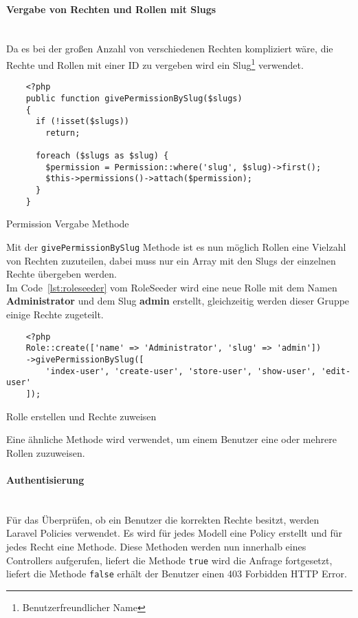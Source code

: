 \paragraph{Vergabe von Rechten und Rollen mit Slugs}\mbox{}\\
Da es bei der großen Anzahl von verschiedenen Rechten kompliziert wäre, die Rechte
und Rollen mit einer ID zu vergeben wird ein Slug\footnote{Benutzerfreundlicher
Name} verwendet.

\begin{listing}[H]
  \begin{verbatim}
    <?php
    public function givePermissionBySlug($slugs)
    {
      if (!isset($slugs))
        return;

      foreach ($slugs as $slug) {
        $permission = Permission::where('slug', $slug)->first();
        $this->permissions()->attach($permission);
      }
    }
  \end{verbatim}
  \caption{Permission Vergabe Methode}
\end{listing}

Mit der \verb|givePermissionBySlug| Methode ist es nun möglich Rollen eine
Vielzahl von Rechten zuzuteilen, dabei muss nur ein Array mit den Slugs der
einzelnen Rechte übergeben werden.\\

Im Code~\ref{lst:roleseeder} vom RoleSeeder wird eine neue Rolle mit
dem Namen \textbf{Administrator} und dem Slug \textbf{admin} erstellt,
gleichzeitig werden dieser Gruppe einige Rechte zugeteilt.

\begin{listing}[H]
  \begin{verbatim}
    <?php
    Role::create(['name' => 'Administrator', 'slug' => 'admin'])
    ->givePermissionBySlug([
        'index-user', 'create-user', 'store-user', 'show-user', 'edit-user'
    ]);
  \end{verbatim}
  \caption{Rolle erstellen und Rechte zuweisen}
  \label{lst:roleseeder}
\end{listing}

Eine ähnliche Methode wird verwendet, um einem Benutzer eine oder mehrere Rollen
zuzuweisen.

\paragraph{Authentisierung}\mbox{}\\
Für das Überprüfen, ob ein Benutzer die korrekten Rechte besitzt, werden Laravel
Policies verwendet. Es wird für jedes Modell eine Policy erstellt und für jedes
Recht eine Methode. Diese Methoden werden nun innerhalb eines Controllers
aufgerufen, liefert die Methode \verb|true| wird die Anfrage fortgesetzt,
liefert die Methode \verb|false| erhält der Benutzer einen 403 Forbidden HTTP Error.

